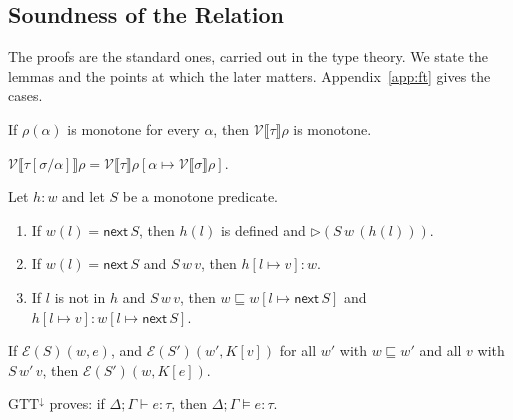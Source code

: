 \documentclass[acmsmall,nonacm,screen]{acmart}
\newcommand{\later}{{\triangleright}}
\newcommand{\nxt}{\mathsf{next}}
\newcommand{\sem}[1]{\llbracket #1 \rrbracket}
\newcommand{\Er}{\mathcal{E}}
\newcommand{\Vr}{\mathcal{V}}
\newcommand{\ext}{\sqsubseteq}
\begin{document}
\subsection{Soundness of the Relation}

The proofs are the standard ones, carried out in the type theory. We state the lemmas and
the points at which the later matters. Appendix~\ref{app:ft} gives the cases.

\begin{lemma}[Monotonicity]\label{lem:mono}
If $\rho(\alpha)$ is monotone for every $\alpha$, then $\Vr\sem{\tau}\rho$ is monotone.
\end{lemma}

\begin{lemma}[Substitution]\label{lem:subst}
$\Vr\sem{\tau[\sigma/\alpha]}\rho = \Vr\sem{\tau}\rho[\alpha \mapsto \Vr\sem{\sigma}\rho]$.
\end{lemma}

\begin{lemma}[Heaps]\label{lem:heaps}
Let $h : w$ and let $S$ be a monotone predicate.
\begin{enumerate}
\item If $w(l) = \nxt\,S$, then $h(l)$ is defined and $\later(S\,w\,(h(l)))$.
\item If $w(l) = \nxt\,S$ and $S\,w\,v$, then $h[l \mapsto v] : w$.
\item If $l$ is not in $h$ and $S\,w\,v$, then $w \ext w[l \mapsto \nxt\,S]$ and
  $h[l \mapsto v] : w[l \mapsto \nxt\,S]$.
\end{enumerate}
\end{lemma}

\begin{lemma}[Bind]\label{lem:bind}
If $\Er(S)(w,e)$, and $\Er(S')(w',K[v])$ for all $w'$ with $w \ext w'$ and all $v$ with
$S\,w'\,v$, then $\Er(S')(w,K[e])$.
\end{lemma}

\begin{theorem}\label{thm:ft}
$\mathrm{GTT}^{\downarrow}$ proves: if $\Delta;\Gamma \vdash e : \tau$, then
$\Delta;\Gamma \vDash e : \tau$.
\end{theorem}
\end{document}
